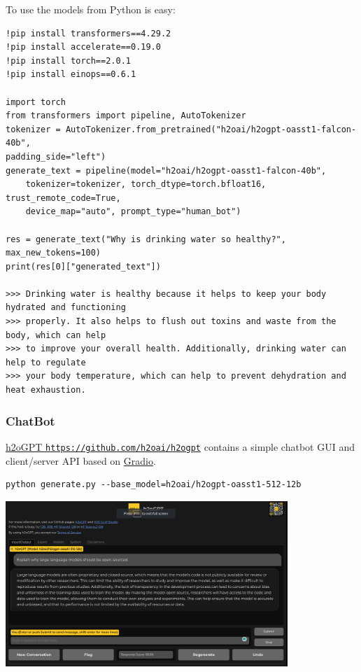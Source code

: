 \documentclass{article}
\begin{document}
To use the models from Python is easy:

\begin{verbatim}
!pip install transformers==4.29.2
!pip install accelerate==0.19.0
!pip install torch==2.0.1
!pip install einops==0.6.1

import torch
from transformers import pipeline, AutoTokenizer
tokenizer = AutoTokenizer.from_pretrained("h2oai/h2ogpt-oasst1-falcon-40b", 
padding_side="left")
generate_text = pipeline(model="h2oai/h2ogpt-oasst1-falcon-40b",
    tokenizer=tokenizer, torch_dtype=torch.bfloat16, trust_remote_code=True, 
    device_map="auto", prompt_type="human_bot")

res = generate_text("Why is drinking water so healthy?", max_new_tokens=100)
print(res[0]["generated_text"])

>>> Drinking water is healthy because it helps to keep your body hydrated and functioning
>>> properly. It also helps to flush out toxins and waste from the body, which can help
>>> to improve your overall health. Additionally, drinking water can help to regulate
>>> your body temperature, which can help to prevent dehydration and heat exhaustion.
\end{verbatim}


\subsubsection{ChatBot}
\href{https://github.com/h2oai/h2ogpt}{\faGithubSquare h2oGPT \texttt{https://github.com/h2oai/h2ogpt}} contains a simple chatbot GUI and client/server API based on \href{https://github.com/gradio-app/gradio}{Gradio}.

\begin{verbatim}
python generate.py --base_model=h2oai/h2ogpt-oasst1-512-12b
\end{verbatim}

\begin{center}
\includegraphics[width=0.8\textwidth]{images/chatbot.png}
\end{center}
\end{document}

